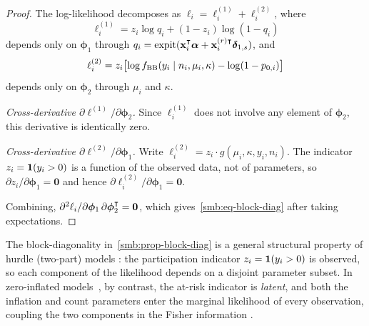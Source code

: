 \begin{proof}
  The log-likelihood decomposes as
  $\ell_i = \ell_i^{(1)} + \ell_i^{(2)}$, where
  \[
    \ell_i^{(1)}
    = z_i\log q_i + (1-z_i)\log(1-q_i)
  \]
  depends only on $\boldsymbol{\phi}_1$ through
  $q_i = \operatorname{expit}(\mathbf{x}_i^\intercal\boldsymbol{\alpha} + \mathbf{x}_i^{(r)\intercal}\boldsymbol{\delta}_{1,s})$, and
  \[
    \ell_i^{(2)}
    = z_i\bigl[\log f_{\textup{BB}}(y_i \mid n_i, \mu_i, \kappa)
      - \log(1-p_{0,i})\bigr]
  \]
  depends only on $\boldsymbol{\phi}_2$ through $\mu_i$ and $\kappa$.

  \medskip\noindent\textit{Cross-derivative
  $\partial\ell^{(1)}/\partial\boldsymbol{\phi}_2$.}\enspace
  Since $\ell_i^{(1)}$ does not involve any element of $\boldsymbol{\phi}_2$,
  this derivative is identically zero.

  \medskip\noindent\textit{Cross-derivative
  $\partial\ell^{(2)}/\partial\boldsymbol{\phi}_1$.}\enspace
  Write $\ell_i^{(2)} = z_i \cdot g(\mu_i,\kappa,y_i,n_i)$.
  The indicator $z_i = \mathbf{1}(y_i > 0)$ is a function of the observed
  data, not of parameters, so
  $\partial z_i/\partial\boldsymbol{\phi}_1 = \mathbf{0}$ and hence
  $\partial\ell_i^{(2)}/\partial\boldsymbol{\phi}_1 = \mathbf{0}$.

  \medskip
  Combining,
  $\partial^2\ell_i/\partial\boldsymbol{\phi}_1\,\partial\boldsymbol{\phi}_2^\intercal = \mathbf{0}$,
  which gives~\eqref{smb:eq-block-diag} after taking expectations.
\end{proof}

\begin{remark}
\label{smb:rem-hurdle-vs-zi}
  The block-diagonality in~\cref{smb:prop-block-diag} is a general
  structural property of hurdle (two-part) models
  \citep{Mullahy1986,Cragg1971}: the
  participation indicator $z_i = \mathbf{1}(y_i > 0)$ is observed, so
  each component of the likelihood depends on a disjoint parameter
  subset.  In zero-inflated models~\citep[e.g.,][]{Lambert1992}, by
  contrast, the at-risk indicator is
  \emph{latent}, and both the inflation and count parameters enter the
  marginal likelihood of every observation, coupling the two components
  in the Fisher information
  \citep[see][for a comprehensive comparison]{NeelonEtAl2016}.
\end{remark}


